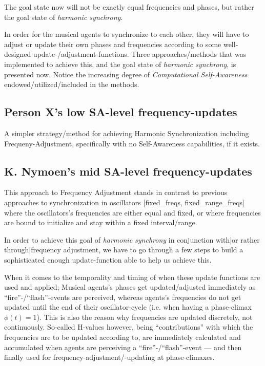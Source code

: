 	The goal state now will not be exactly equal frequencies and phases, but rather the goal state of \textit{harmonic synchrony}.
	
	In order for the musical agents to synchronize to each other, they will have to adjust or update their own phases and frequencies according to some well-designed update-/adjustment-functions. Three approaches/methods that was implemented to achieve this, and the goal state of \textit{harmonic synchrony}, is presented now. Notice the increasing degree of \textit{Computational Self-Awareness} endowed/utilized/included in the methods.
	
	
	
	
	\subsection{Person X's low SA-level frequency-updates}
	
	A simpler strategy/method for achieving Harmonic Synchronization including Frequeny-Adjustment, specifically with no Self-Awareness capabilities, if it exists.
	
	
	

	
	\subsection{K. Nymoen's mid SA-level frequency-updates}
	
	This approach to Frequency Adjustment stands in contrast to previous approaches to synchronization in oscillators [fixed\_freqs, fixed\_range\_freqs] where the oscillators's frequencies are either equal and fixed, or where frequencies are bound to initialize and stay within a fixed interval/range.
	
	In order to achieve this goal of \textit{harmonic synchrony} in conjunction with|or rather through|frequency adjustment, we have to go through a few steps to build a sophisticated enough update-function able to help us achieve this.
	
	When it comes to the temporality and timing of when these update functions are used and applied; Musical agents's phases get updated/adjusted immediately as ``fire''-/``flash''-events are perceived, whereas agents's frequencies do not get updated until the end of their oscillator-cycle (i.e. when having a phase-climax $\phi(t)=1$). This is also the reason why frequencies are updated discretely, not continuously. So-called H-values however, being ``contributions'' with which the frequencies are to be updated according to, are immediately calculated and accumulated when agents are perceiving a ``fire''-/``flash''-event — and then finally used for frequency-adjustment/-updating at phase-climaxes.
			
